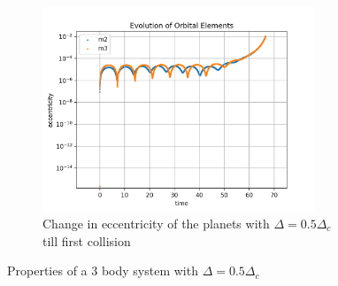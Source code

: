 \documentclass[12pt,a4paper]{article}
\begin{document}
\begin{figure}[H]
  \begin{subfigure}{0.4\textwidth}
    \centering
    \includegraphics[height = 2.4in]{3Body/3BD_ecc_delta0.5_till_collision.png}
    \caption{Change in eccentricity of the planets with $\Delta = 0.5\Delta_c$ till first collision}
    \label{fig:3Body_0.5_ecc}
  \end{subfigure}
  \caption{Properties of a 3 body system with $\Delta = 0.5\Delta_c$}
\end{figure}
\end{document}
